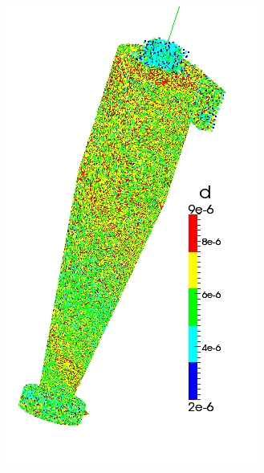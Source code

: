 \begin{figure}[h]
\begin{minipage}{0.2\linewidth}
	\end{minipage}
		\hspace{-1em}
	\begin{minipage}{0.2\linewidth}
		\includegraphics[scale=0.3]{t10}
	\end{minipage}
	\label{fig:t1}
\end{figure}